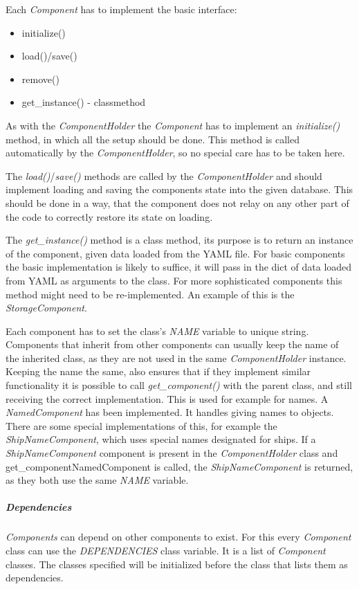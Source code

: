 Each \textit{Component} has to implement the basic interface:
\begin{itemize}
    \item initialize()
    \item load()/save()
    \item remove()
    \item get\_instance() - classmethod
\end{itemize}
As with the \textit{ComponentHolder} the \textit{Component} has to implement an \textit{initialize()} method, in which
all the setup should be done. This method is called automatically by the \textit{ComponentHolder}, so no special care
has to be taken here.

The \textit{load()}/\textit{save()} methods are called by the \textit{ComponentHolder} and should
implement loading and saving the components state into the given database. This should be done in a way, that the
component does not relay on any other part of the code to correctly restore its state on loading.

The \textit{get\_instance()} method is a class method, its purpose is to return an instance of the component, given data loaded
from the YAML file. For basic components the basic implementation is likely to suffice, it will pass in the dict of data
loaded from YAML as arguments to the class. For more sophisticated components this method might need to be
re-implemented. An example of this is the \textit{StorageComponent}.

Each component has to set the class's \textit{NAME} variable to unique string. Components that inherit from other
components can usually keep the name of the inherited class, as they are not used in the same \textit{ComponentHolder}
instance. Keeping the name the same, also ensures that if they implement similar functionality it is possible to call
\textit{get\_component()} with the parent class, and still receiving the correct implementation. This is used for example
for names. A \textit{NamedComponent} has been implemented. It handles giving names to objects. There are some special
implementations of this, for example the \textit{ShipNameComponent}, which uses special names designated for ships. If a
\textit{ShipNameComponent} component is present in the \textit{ComponentHolder} class and get\_component{NamedComponent}
is called, the \textit{ShipNameComponent} is returned, as they both use the same \textit{NAME} variable.

\subparagraph{Dependencies}
\textit{Components} can depend on other components to exist. For this every \textit{Component} class can use the
\textit{DEPENDENCIES} class variable. It is a list of \textit{Component} classes. The classes specified will be
initialized before the class that lists them as dependencies. 

